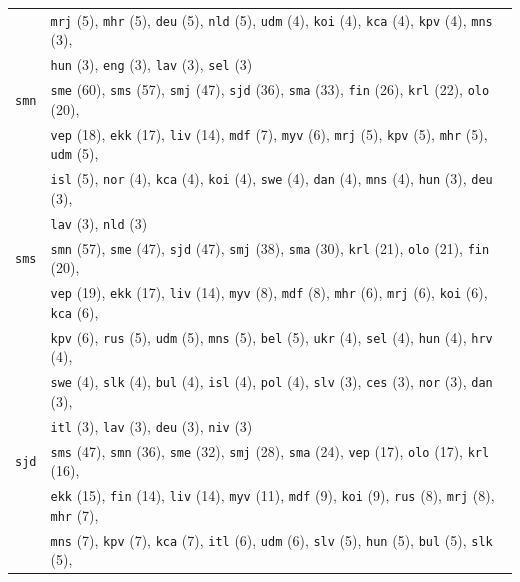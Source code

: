 \begin{center}
\begin{longtable}{ll}
 & \texttt{mrj} (5), \texttt{mhr} (5), \texttt{deu} (5), \texttt{nld} (5), \texttt{udm} (4), \texttt{koi} (4), \texttt{kca} (4), \texttt{kpv} (4), \texttt{mns} (3),\\
 & \texttt{hun} (3), \texttt{eng} (3), \texttt{lav} (3), \texttt{sel} (3) \\
\texttt{smn} & \texttt{sme} (60), \texttt{sms} (57), \texttt{smj} (47), \texttt{sjd} (36), \texttt{sma} (33), \texttt{fin} (26), \texttt{krl} (22), \texttt{olo} (20),\\
 & \texttt{vep} (18), \texttt{ekk} (17), \texttt{liv} (14), \texttt{mdf} (7), \texttt{myv} (6), \texttt{mrj} (5), \texttt{kpv} (5), \texttt{mhr} (5), \texttt{udm} (5),\\
 & \texttt{isl} (5), \texttt{nor} (4), \texttt{kca} (4), \texttt{koi} (4), \texttt{swe} (4), \texttt{dan} (4), \texttt{mns} (4), \texttt{hun} (3), \texttt{deu} (3),\\
 & \texttt{lav} (3), \texttt{nld} (3) \\
\texttt{sms} & \texttt{smn} (57), \texttt{sme} (47), \texttt{sjd} (47), \texttt{smj} (38), \texttt{sma} (30), \texttt{krl} (21), \texttt{olo} (21), \texttt{fin} (20),\\
 & \texttt{vep} (19), \texttt{ekk} (17), \texttt{liv} (14), \texttt{myv} (8), \texttt{mdf} (8), \texttt{mhr} (6), \texttt{mrj} (6), \texttt{koi} (6), \texttt{kca} (6),\\
 & \texttt{kpv} (6), \texttt{rus} (5), \texttt{udm} (5), \texttt{mns} (5), \texttt{bel} (5), \texttt{ukr} (4), \texttt{sel} (4), \texttt{hun} (4), \texttt{hrv} (4),\\
 & \texttt{swe} (4), \texttt{slk} (4), \texttt{bul} (4), \texttt{isl} (4), \texttt{pol} (4), \texttt{slv} (3), \texttt{ces} (3), \texttt{nor} (3), \texttt{dan} (3),\\
 & \texttt{itl} (3), \texttt{lav} (3), \texttt{deu} (3), \texttt{niv} (3) \\
\texttt{sjd} & \texttt{sms} (47), \texttt{smn} (36), \texttt{sme} (32), \texttt{smj} (28), \texttt{sma} (24), \texttt{vep} (17), \texttt{olo} (17), \texttt{krl} (16),\\
 & \texttt{ekk} (15), \texttt{fin} (14), \texttt{liv} (14), \texttt{myv} (11), \texttt{mdf} (9), \texttt{koi} (9), \texttt{rus} (8), \texttt{mrj} (8), \texttt{mhr} (7),\\
 & \texttt{mns} (7), \texttt{kpv} (7), \texttt{kca} (7), \texttt{itl} (6), \texttt{udm} (6), \texttt{slv} (5), \texttt{hun} (5), \texttt{bul} (5), \texttt{slk} (5),\\

\end{longtable}
\end{center}

